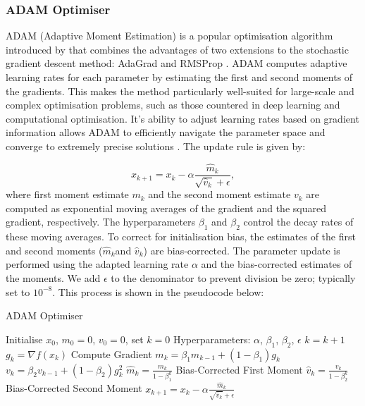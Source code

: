 \documentclass[a4paper]{report}
\begin{document}
\subsubsection{ADAM Optimiser}\label{section:ADAM}
ADAM (Adaptive Moment Estimation) is a popular optimisation algorithm introduced by \citet{kingma2014adam} that combines the advantages of two extensions to the stochastic gradient descent method: AdaGrad \citep{duchi2011adaptive} and RMSProp \citep{tieleman2012rmsprop}. ADAM computes adaptive learning rates for each parameter by estimating the first and second moments of the gradients. This makes the method particularly well-suited for large-scale and complex optimisation problems, such as those countered in deep learning and computational optimisation. It's ability to adjust learning rates based on gradient information allows ADAM to efficiently navigate the parameter space and converge to extremely precise solutions \citep{reddi2019convergence}. The update rule is given by:

\begin{equation}
x_{k+1} = x_{k} - \alpha \frac{\hat{m}_{k}}{\sqrt{\hat{v}_{k}} + \epsilon},
\end{equation}
where first moment estimate $m_k$ and the second moment estimate $v_k$ are computed as exponential moving averages of the gradient and the squared gradient, respectively. The hyperparameters $\beta_1$ and $\beta_2$ control the decay rates of these moving averages. To correct for initialisation bias, the estimates of the first and second moments ($\hat{m}_k$and $\hat{v}_k$) are bias-corrected. The parameter update is performed using the adapted learning rate $\alpha$ and the bias-corrected estimates of the moments. We add $\epsilon$ to the denominator to prevent division be zero; typically set to $10^{-8}$. This process is shown in the pseudocode below:

\begin{algorithm}[H]
\caption{ADAM Optimiser}
\label{algo:ADAM}
\begin{algorithmic}[1]
\State Initialise \( x_0 \), \( m_0 = 0 \), \( v_0 = 0 \), set \( k = 0 \)
\State Hyperparameters: \( \alpha \), \( \beta_1 \), \( \beta_2 \), \( \epsilon \)
    \State \( k = k + 1 \)
    \State \( g_k = \nabla f(x_k) \) \Comment Compute Gradient
    \State \( m_k = \beta_1 m_{k-1} + (1 - \beta_1) g_k \)
    \State \( v_k = \beta_2 v_{k-1} + (1 - \beta_2) g_k^2 \)
    \State \( \hat{m}_k = \frac{m_k}{1 - \beta_1^k} \) \Comment Bias-Corrected First Moment
    \State  \( \hat{v}_k = \frac{v_k}{1 - \beta_2^k} \) \Comment Bias-Corrected Second Moment
    \State \( x_{k+1} = x_k - \alpha \frac{\hat{m}_k}{\sqrt{\hat{v}_k} + \epsilon} \)
\EndWhile
\end{algorithmic}
\end{algorithm}
\end{document}
